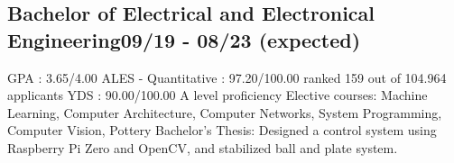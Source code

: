 \vspace*{10pt}
\subsection{{Bachelor of Electrical and Electronical Engineering}\hfill 09/19 - 08/23 (expected)}
\vspace*{5pt}
GPA : 3.65/4.00 \newline
ALES - Quantitative : 97.20/100.00 \hfill ranked 159 out of 104.964 applicants \newline
YDS : 90.00/100.00 \hfill A level proficiency \newline
Elective courses: Machine Learning, Computer Architecture, Computer Networks, System Programming, Computer Vision, Pottery \newline
Bachelor's Thesis: Designed a control system using Raspberry Pi Zero and OpenCV, and stabilized ball and plate system.
